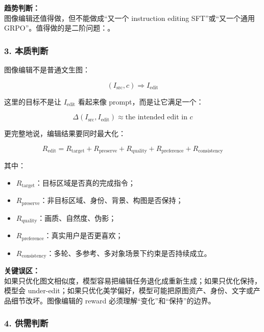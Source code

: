 \begin{summarybox}
\textbf{趋势判断：}\\
图像编辑还值得做，但不能做成“又一个 instruction editing SFT”或“又一个通用 GRPO”。值得做的是二阶问题：。
\end{summarybox}

\subsubsection*{3. 本质判断}

图像编辑不是普通文生图：

\[
(I_\text{src}, c)
\Rightarrow
I_\text{edit}
\]

这里的目标不是让 $I_\text{edit}$ 看起来像 prompt，而是让它满足一个：

\[
\Delta(I_\text{src}, I_\text{edit})
\approx
\text{the intended edit in } c
\]

更完整地说，编辑结果要同时最大化：

\[
R_\text{edit}
=
R_\text{target}
+
R_\text{preserve}
+
R_\text{quality}
+
R_\text{preference}
+
R_\text{consistency}
\]

其中：

\begin{itemize}[leftmargin=1.5em]
  \item $R_\text{target}$：目标区域是否真的完成指令；
  \item $R_\text{preserve}$：非目标区域、身份、背景、构图是否保持；
  \item $R_\text{quality}$：画质、自然度、伪影；
  \item $R_\text{preference}$：真实用户是否更喜欢；
  \item $R_\text{consistency}$：多轮、多参考、多对象场景下约束是否持续成立。
\end{itemize}

\begin{warnbox}
\textbf{关键误区：}\\
如果只优化图文相似度，模型容易把编辑任务退化成重新生成；如果只优化保持，模型会 under-edit；如果只优化美学偏好，模型可能把原图资产、身份、文字或产品细节改坏。图像编辑的 reward 必须理解“变化”和“保持”的边界。
\end{warnbox}

\subsubsection*{4. 供需判断}

